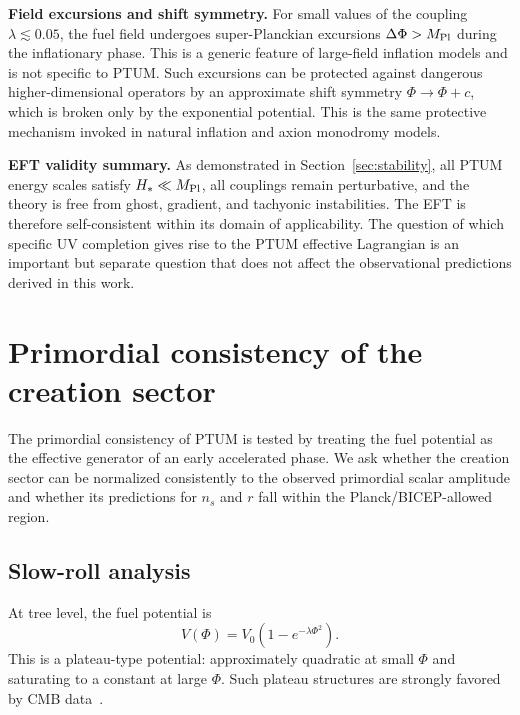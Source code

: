 \documentclass[epj]{svjour}
\begin{document}
\noindent\textbf{Field excursions and shift symmetry.}
For small values of the coupling $\lambda \lesssim 0.05$, the fuel
field undergoes super-Planckian excursions $\Delta\Phi > M_{\rm Pl}$
during the inflationary phase. This is a generic feature of
large-field inflation models and is not specific to PTUM. Such
excursions can be protected against dangerous higher-dimensional
operators by an approximate shift symmetry $\Phi \to \Phi + c$,
which is broken only by the exponential potential. This is the same
protective mechanism invoked in natural inflation
\cite{Freese1990} and axion monodromy \cite{Silverstein2008} models.

\noindent\textbf{EFT validity summary.}
As demonstrated in Section~\ref{sec:stability}, all PTUM energy
scales satisfy $H_* \ll M_{\rm Pl}$, all couplings remain
perturbative, and the theory is free from ghost, gradient, and
tachyonic instabilities. The EFT is therefore self-consistent within
its domain of applicability. The question of which specific UV
completion gives rise to the PTUM effective Lagrangian is an
important but separate question that does not affect the
observational predictions derived in this work.

\section{Primordial consistency of the creation sector}
\label{sec:primordial}

The primordial consistency of PTUM is tested by treating the fuel
potential as the effective generator of an early accelerated phase.
We ask whether the creation sector can be normalized consistently
to the observed primordial scalar amplitude and whether its
predictions for \(n_s\) and \(r\) fall within the
Planck/BICEP-allowed region.

\subsection{Slow-roll analysis}

At tree level, the fuel potential is
\begin{equation}
V(\Phi)=V_0\!\left(1-e^{-\lambda\Phi^2}\right).
\label{eq:fuelpot}
\end{equation}
This is a plateau-type potential: approximately quadratic at small
\(\Phi\) and saturating to a constant at large \(\Phi\). Such
plateau structures are strongly favored by CMB data~\cite{BICEPKeck2021}.
\end{document}
